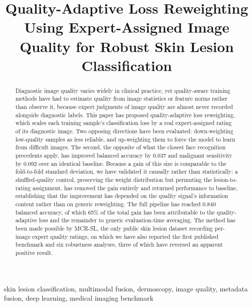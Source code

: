 \documentclass[conference]{IEEEtran}
\begin{document}
\title{Quality-Adaptive Loss Reweighting Using Expert-Assigned Image Quality for Robust Skin Lesion Classification}

\author{
}

\maketitle

\begin{abstract}
Diagnostic image quality varies widely in clinical practice, yet quality-aware training methods have had to estimate quality from image statistics or feature norms rather than observe it, because expert judgments of image quality are almost never recorded alongside diagnostic labels. This paper has proposed quality-adaptive loss reweighting, which scales each training sample's classification loss by a real expert-assigned rating of its diagnostic image. Two opposing directions have been evaluated: down-weighting low-quality samples as less reliable, and up-weighting them to force the model to learn from difficult images. The second, the opposite of what the closest face recognition precedents apply, has improved balanced accuracy by 0.037 and malignant sensitivity by 0.092 over an identical baseline. Because a gain of this size is comparable to the fold-to-fold standard deviation, we have validated it causally rather than statistically: a shuffled-quality control, preserving the weight distribution but permuting the lesion-to-rating assignment, has removed the gain entirely and returned performance to baseline, establishing that the improvement has depended on the quality signal's information content rather than on generic reweighting. The full pipeline has reached 0.840 balanced accuracy, of which 65\% of the total gain has been attributable to the quality-adaptive loss and the remainder to generic evaluation-time averaging. The method has been made possible by MCR-SL, the only public skin lesion dataset recording per-image expert quality ratings, on which we have also reported the first published benchmark and six robustness analyses, three of which have reversed an apparent positive result.
\end{abstract}

\begin{IEEEkeywords}
skin lesion classification, multimodal fusion, dermoscopy, image quality, metadata fusion, deep learning, medical imaging benchmark
\end{IEEEkeywords}
\end{document}
